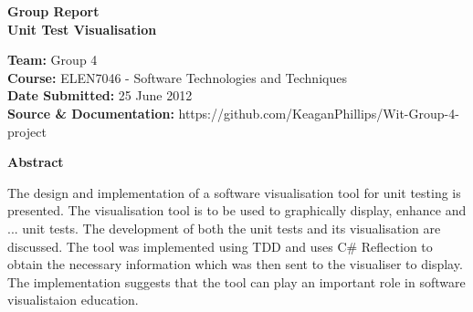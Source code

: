 \documentclass[a4paper,12pt]{article}
\begin{document}
\begin{center}
\begin{Huge}
\textbf{{\LARGE Group Report\\ Unit Test Visualisation }}
\linebreak
\linebreak
\linebreak
\linebreak
\end{Huge}\end{center}




\begin{small}
\begin{flushleft}
\textbf{Team:} Group 4
\\
\textbf{Course:} ELEN7046 - Software Technologies and Techniques
\\
\textbf{Date Submitted:} 25 June 2012
\\
\textbf{Source \& Documentation:} https://github.com/KeaganPhillips/Wit-Group-4-project
\linebreak
\linebreak
\linebreak
\linebreak
\linebreak
\end{flushleft}
\end{small}


\begin{flushleft}
\textbf{{\large Abstract}}
\end{flushleft}
The design and implementation of a software visualisation tool for unit testing is presented. The visualisation tool is to be used to graphically display, enhance and ... unit tests. The development of both the unit tests and its visualisation are discussed. The tool was implemented using TDD and uses C\# Reflection to obtain the necessary information which was then sent to the visualiser to display. The implementation suggests that the tool can play an important role in software visualistaion education.    
\clearpage


\tableofcontents


\clearpage
\end{document}
